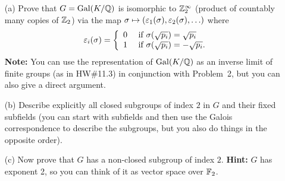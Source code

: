 \documentclass[12pt]{amsart}
\begin{document}
\begin{itemize}
\item[(a)] Prove that $G={\rm Gal}(K/{\mathbb Q})$ is isomorphic to ${\mathbb Z}_2^{\infty}$ (product of countably many copies of ${\mathbb Z}_2$)
via the map $\sigma\mapsto ({\varepsilon}_1(\sigma),{\varepsilon}_2(\sigma),\ldots)$ where 
$$
{\varepsilon}_i(\sigma)=\left\{
\begin{array}{ll}
0 & \mbox{ if } \sigma(\sqrt{p_i})=\sqrt{p_i}\\
1 & \mbox{ if } \sigma(\sqrt{p_i})=-\sqrt{p_i}.
\end{array}
\right.
$$
{\bf Note:} You can use the representation of ${\rm Gal}(K/{\mathbb Q})$ as an inverse
limit of finite groups (as in HW\#11.3) in conjunction with Problem~2, but you can also give a direct argument.
\item[(b)] Describe explicitly all closed subgroups of index $2$ in $G$ and their fixed subfields (you can start with subfields and then use the Galois correspondence to describe the subgroups, but you also do things in the opposite order).
\item[(c)] Now prove that $G$ has a non-closed subgroup of index $2$. {\bf Hint:} $G$ has exponent 2, so you can think of it as vector space
over ${\mathbb F}_2$.
\end{itemize} 
\end{document}

